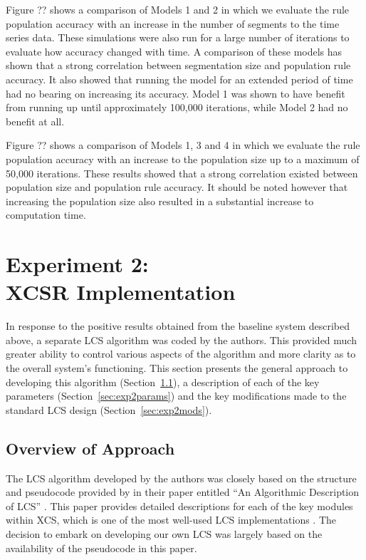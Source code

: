 \documentclass[11pt]{article}
\begin{document}
\begin{multicols}{2}

Figure ?? shows a comparison of Models 1 and 2 in which we evaluate the rule population accuracy with an increase in the number of segments to the time series data. These simulations were also run for a large number of iterations to evaluate how accuracy changed with time. A comparison of these models has shown that a strong correlation between segmentation size and population rule accuracy. It also showed that running the model for an extended period of time had no bearing on increasing its accuracy. Model 1 was shown to have benefit from running up until approximately 100,000 iterations, while Model 2 had no benefit at all.


Figure ?? shows a comparison of Models 1, 3 and 4 in which we evaluate the rule population accuracy with an increase to the population size up to a maximum of 50,000 iterations. These results showed that a strong correlation existed between population size and population rule accuracy. It should be noted however that increasing the population size also resulted in a substantial increase to computation time.


\section{Experiment 2:\\XCSR Implementation}
\label{sec:exp2}

In response to the positive results obtained from the baseline system described above, a separate LCS algorithm was coded by the authors. This provided much greater ability to control various aspects of the algorithm and more clarity as to the overall system's functioning. This section presents the general approach to developing this algorithm (Section~\ref{sec:exp2appr}), a description of each of the key parameters (Section~\ref{sec:exp2params}) and the key modifications made to the standard LCS design (Section~\ref{sec:exp2mods}).





\subsection{Overview of Approach}
\label{sec:exp2appr}

The LCS algorithm developed by the authors was closely based on the structure and pseudocode provided by \citeauthor{Butz2000} in their paper entitled ``An Algorithmic Description of LCS'' \cite{Butz2000}. This paper provides detailed descriptions for each of the key modules within XCS, which is one of the most well-used LCS implementations \cite{Sigaud2007}. The decision to embark on developing our own LCS was largely based on the availability of the pseudocode in this paper.


\end{multicols}
\end{document}
